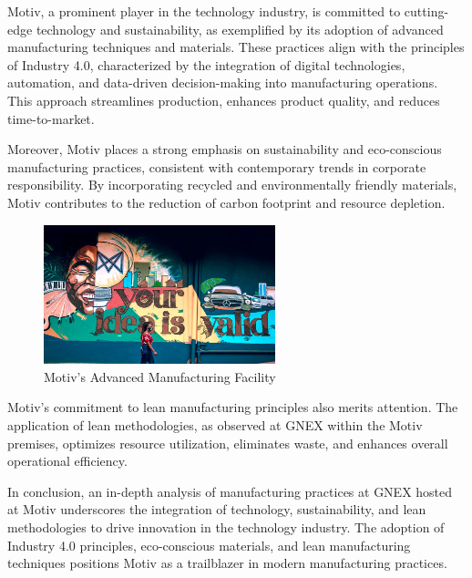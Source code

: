 Motiv, a prominent player in the technology industry, is committed to cutting-edge technology and sustainability, as exemplified by its adoption of advanced manufacturing techniques and materials. These practices align with the principles of Industry 4.0, characterized by the integration of digital technologies, automation, and data-driven decision-making into manufacturing operations. This approach streamlines production, enhances product quality, and reduces time-to-market.

Moreover, Motiv places a strong emphasis on sustainability and eco-conscious manufacturing practices, consistent with contemporary trends in corporate responsibility. By incorporating recycled and environmentally friendly materials, Motiv contributes to the reduction of carbon footprint and resource depletion.

\begin{figure}[ht]
\centering
\includegraphics[width=0.6\textwidth]{images/motiv-manufacturing.png}
\caption{Motiv's Advanced Manufacturing Facility}
\label{fig:motiv-manufacturing}
\end{figure}

Motiv's commitment to lean manufacturing principles also merits attention. The application of lean methodologies, as observed at GNEX within the Motiv premises, optimizes resource utilization, eliminates waste, and enhances overall operational efficiency.

In conclusion, an in-depth analysis of manufacturing practices at GNEX hosted at Motiv underscores the integration of technology, sustainability, and lean methodologies to drive innovation in the technology industry. The adoption of Industry 4.0 principles, eco-conscious materials, and lean manufacturing techniques positions Motiv as a trailblazer in modern manufacturing practices.
